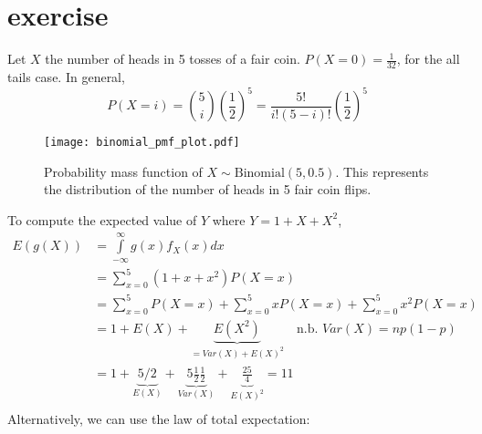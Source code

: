 \documentclass{article}
\begin{document}
\section{exercise}
Let $X$ the number of heads in 5 tosses of a fair coin.
$P(X=0) = \frac{1}{32}$, for the all tails case. In general, \[P(X=i) = \binom{5}{i} \left(\frac{1}{2}\right)^5 = \frac{5!}{i!(5-i)!} \left(\frac{1}{2}\right)^5\]
\begin{figure}[h!]
    \centering
    \texttt{[image: binomial\_pmf\_plot.pdf]}
    \caption{Probability mass function of $X \sim \mathrm{Binomial}(5, 0.5)$. This represents the distribution of the number of heads in 5 fair coin flips.}
    \label{fig:binomial_pmf}
\end{figure}
To compute the expected value of $Y$ where $Y = 1 + X + X^2$,
\[\begin{aligned}
        E\left( {g\left( X \right)} \right) & = \int\limits_{ - \infty }^\infty  {g\left( x \right){f_X}\left( x \right)dx}                                                                                                      \\
                                            & = \sum\limits_{x = 0}^5 {\left( {1 + x + {x^2}} \right)P\left( {X = x} \right)}                                                                                                    \\
                                            & = \sum\limits_{x = 0}^5 {P\left( {X = x} \right)}  + \sum\limits_{x = 0}^5 {{x}P\left( {X = x} \right)}  + \sum\limits_{x = 0}^5 {{x^2}P\left( {X = x} \right)}                    \\
                                            & = 1 + E\left( X \right) + \underbrace {E\left( {{X^2}} \right)}_{=Var\left( X \right) + E{{\left( X \right)}^2}} \quad \text{n.b. } Var\left( X \right) = np\left( {1 - p} \right) \\
                                            & = 1 + \underbrace {5/2}_{E\left( X \right)} + \underbrace {5\frac{1}{2}\frac{1}{2}}_{Var\left( X \right)} + \underbrace {\frac{{25}}{4}}_{E{{\left( X \right)}^2}} = 11            \\
    \end{aligned} \]
Alternatively, we can use the law of total expectation:
\end{document}
